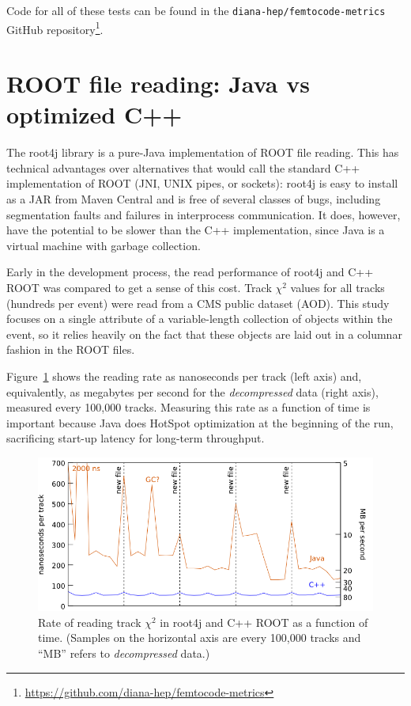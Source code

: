 \documentclass[12pt]{article}
\begin{document}
Code for all of these tests can be found in the {\tt diana-hep/femtocode-metrics} GitHub repository\footnote{\url{https://github.com/diana-hep/femtocode-metrics}}.

\section*{ROOT file reading: Java vs optimized C++}

The root4j library is a pure-Java implementation of ROOT file reading. This has technical advantages over alternatives that would call the standard C++ implementation of ROOT (JNI, UNIX pipes, or sockets): root4j is easy to install as a JAR from Maven Central and is free of several classes of bugs, including segmentation faults and failures in interprocess communication. It does, however, have the potential to be slower than the C++ implementation, since Java is a virtual machine with garbage collection.

Early in the development process, the read performance of root4j and C++ ROOT was compared to get a sense of this cost. Track $\chi^2$ values for all tracks (hundreds per event) were read from a CMS public dataset (AOD). This study focuses on a single attribute of a variable-length collection of objects within the event, so it relies heavily on the fact that these objects are laid out in a columnar fashion in the ROOT files.

Figure~\ref{root4j_reading_tracks} shows the reading rate as nanoseconds per track (left axis) and, equivalently, as megabytes per second for the {\it decompressed} data (right axis), measured every 100,000 tracks. Measuring this rate as a function of time is important because Java does HotSpot optimization at the beginning of the run, sacrificing start-up latency for long-term throughput.

\begin{figure}
\begin{center}
\includegraphics[width=0.8\linewidth]{root4j_reading_tracks.png}
\end{center}

\caption{\label{root4j_reading_tracks} Rate of reading track $\chi^2$ in root4j and C++ ROOT as a function of time. (Samples on the horizontal axis are every 100,000 tracks and ``MB'' refers to {\it decompressed} data.)}
\end{figure}
\end{document}
